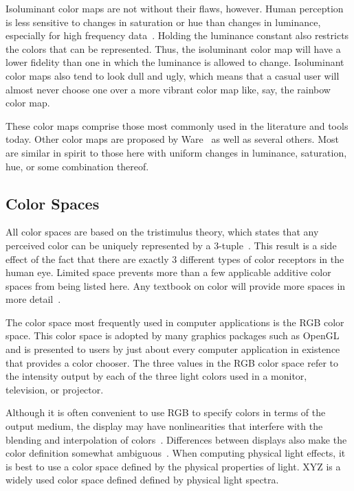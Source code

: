 \documentclass[twocolumn]{article}
\newcommand{\lcite}[1]{~\cite{#1}}
\newcommand{\scite}[1]{~\cite{#1}}
\newcommand{\RGB}{RGB\xspace}
\newcommand{\XYZ}{XYZ\xspace}
\begin{document}
Isoluminant color maps are not without their flaws, however.  Human
perception is less sensitive to changes in saturation or hue than changes
in luminance, especially for high frequency data\lcite{Rogowitz96}.
Holding the luminance constant also restricts the colors that can be
represented.  Thus, the isoluminant color map will have a lower fidelity
than one in which the luminance is allowed to change.  Isoluminant color
maps also tend to look dull and ugly, which means that a casual user will
almost never choose one over a more vibrant color map like, say, the
rainbow color map.

These color maps comprise those most commonly used in the literature and tools
today.  Other color maps are proposed by Ware\scite{Ware04} as well as
several others.  Most are similar in spirit to those here with uniform
changes in luminance, saturation, hue, or some combination thereof.

\subsection{Color Spaces}
\label{sec:PreviousWork:ColorSpaces}

All color spaces are based on the tristimulus theory, which states that any
perceived color can be uniquely represented by a
3-tuple\lcite{Feynman63,Stone05,Wyszecki82}.  This result is a side effect
of the fact that there are exactly 3 different types of color receptors in
the human eye.  Limited space prevents more than a few applicable additive
color spaces from being listed here.  Any textbook on color will provide
more spaces in more detail\lcite{Stone03,Wyszecki82}.

The color space most frequently used in computer applications is the \RGB
color space.  This color space is adopted by many graphics packages such as
OpenGL and is presented to users by just about every computer application
in existence that provides a color chooser.  The three values in the \RGB
color space refer to the intensity output by each of the three light colors
used in a monitor, television, or projector.

Although it is often convenient to use \RGB to specify colors in terms of
the output medium, the display may have nonlinearities that interfere with
the blending and interpolation of colors\lcite{Stone03}.  Differences
between displays also make the color definition somewhat
ambiguous\lcite{Fortner97}.  When computing physical light effects, it is
best to use a color space defined by the physical properties of light.
\XYZ is a widely used color space defined defined by physical light
spectra.
\end{document}
